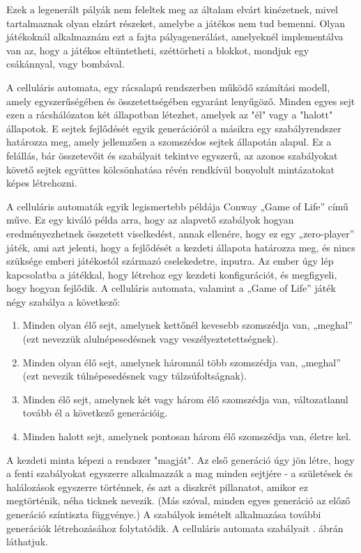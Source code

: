 Ezek a legenerált pályák nem feleltek meg az általam elvárt kinézetnek, mivel tartalmaznak olyan elzárt részeket, amelybe a játékos nem tud bemenni. Olyan játékoknál alkalmaznám ezt a fajta pályagenerálást, amelyeknél implementálva van az, hogy a játékos eltüntetheti, széttörheti a blokkot, mondjuk egy csákánnyal, vagy bombával.


A celluláris automata, egy rácsalapú rendszerben működő számítási modell, amely egyszerűségében és összetettségében egyaránt lenyűgöző. Minden egyes sejt ezen a rácshálózaton két állapotban létezhet, amelyek az "él" vagy a "halott" állapotok. E sejtek fejlődését egyik generációról a másikra egy szabályrendszer határozza meg, amely jellemzően a szomszédos sejtek állapotán alapul. Ez a felállás, bár összetevőit és szabályait tekintve egyszerű, az azonos szabályokat követő sejtek együttes kölcsönhatása révén rendkívül bonyolult mintázatokat képes létrehozni. \cite{cellular}

A celluláris automaták egyik legismertebb példája Conway „Game of Life” című műve. Ez egy kiváló példa arra, hogy az alapvető szabályok hogyan eredményezhetnek összetett viselkedést, annak ellenére, hogy ez egy „zero-player” játék, ami azt jelenti, hogy a fejlődését a kezdeti állapota határozza meg, és nincs szüksége emberi játékostól származó cselekedetre, inputra. Az ember úgy lép kapcsolatba a játékkal, hogy létrehoz egy kezdeti konfigurációt, és megfigyeli, hogy hogyan fejlődik. A celluláris automata, valamint a „Game of Life” játék négy szabálya a következő: \cite{conway}
\begin{enumerate}
\item Minden olyan élő sejt, amelynek kettőnél kevesebb szomszédja van, „meghal” (ezt nevezzük alulnépesedésnek vagy veszélyeztetettségnek).
\item Minden olyan élő sejt, amelynek háromnál több szomszédja van, „meghal” (ezt nevezik túlnépesedésnek vagy túlzsúfoltságnak).
\item Minden élő sejt, amelynek két vagy három élő szomszédja van, változatlanul tovább él a következő generációig.
\item Minden halott sejt, amelynek pontosan három élő szomszédja van, életre kel.
\end{enumerate}

A kezdeti minta képezi a rendszer "magját". Az első generáció úgy jön létre, hogy a fenti szabályokat egyszerre alkalmazzák a mag minden sejtjére - a születések és halálozások egyszerre történnek, és azt a diszkrét pillanatot, amikor ez megtörténik, néha ticknek nevezik. (Más szóval, minden egyes generáció az előző generáció színtiszta függvénye.) A szabályok ismételt alkalmazása további generációk létrehozásához folytatódik. \cite{conway} A celluláris automata szabályait . ábrán láthatjuk.


